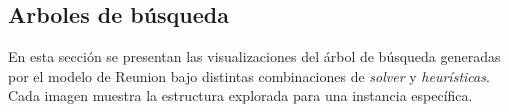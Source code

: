 
\subsection{Arboles de búsqueda}\label{sec:05-reunion-arboles}
En esta sección se presentan las visualizaciones del árbol de búsqueda generadas por el modelo de Reunion bajo distintas combinaciones de \emph{solver} y \emph{heurísticas}. Cada imagen muestra la estructura explorada para una instancia específica.
